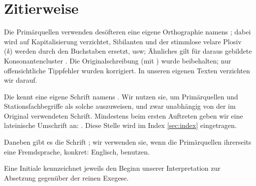 \section*{Zitierweise}

Die Primärquellen verwenden desöfteren  eine eigene Orthographie namens  ; dabei wird auf Kapitalisierung verzichtet,  Sibilanten und der stimmlose velare Plosiv (\emph{k}) werden durch den Buchstaben  ersetzt, usw; Ähnliches gilt für daraus gebildete Konsonantencluster \cite[S.~46]{cbasebook}  \cite{clang}. Die Originalschreibung (mit ) wurde beibehalten; nur offensichtliche Tippfehler wurden korrigiert. In unseren eigenen Texten verzichten wir darauf.

Die  kennt eine eigene Schrift namens . Wir nutzen sie, um Primärquellen und Stationsfachbegriffe als solche auszuweisen, und zwar unabhängig von der im Original verwendeten Schrift. Mindestens beim ersten Auftreten geben wir eine lateinische Umschrift an: . Diese Stelle wird im Index \cref{sec:index} eingetragen.


Daneben gibt es die Schrift ; wir verwenden sie, wenn die Primärquellen ihrerseits eine Fremdsprache, konkret: Englisch, benutzen.

Eine Initiale kennzeichnet jeweils den Beginn unserer Interpretation zur Absetzung gegenüber der reinen Exegese.


